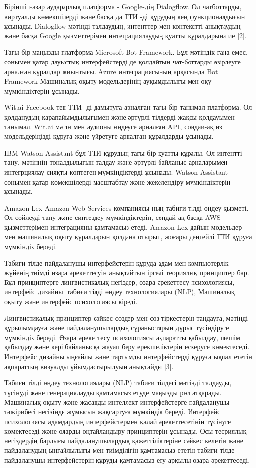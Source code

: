 \begin{multicols}{2}
Бірінші назар аударарлық платформа - Google-дің Dialogflow. Ол
чатботтарды, виртуалды көмекшілерді және басқа да ТТИ -ді құрудың кең
функционалдығын ұсынады. Dialogflow мәтінді талдаудың, интенттер мен
контекстті анықтаудың және басқа Google қызметтерімен интеграциялаудың
қуатты құралдарына ие {[}2{]}.

Тағы бір маңызды платформа-Microsoft Bot Framework. Бұл мәтіндік ғана
емес, сонымен қатар дауыстық интерфейстерді де қолдайтын чат-боттарды
әзірлеуге арналған құралдар жиынтығы. Azure интеграциясының арқасында
Bot Framework Машиналық оқыту модельдерінің ауқымдылығы мен оқу
мүмкіндіктерін ұсынады.

Wit.ai Facebook-тен-ТТИ -ді дамытуға арналған тағы бір танымал
платформа. Ол қолданудың қарапайымдылығымен және әртүрлі тілдерді жақсы
қолдауымен танымал. Wit.ai мәтін мен аудионы өңдеуге арналған API,
сондай-ақ өз модельдеріңізді құруға және үйретуге арналған құралдарды
ұсынады.

IBM Watson Assistant-бұл ТТИ құрудың тағы бір қуатты құралы. Ол интентті
тану, мәтіннің тоналдылығын талдау және әртүрлі байланыс арналарымен
интегрциялау сияқты көптеген мүмкіндіктерді ұсынады. Watson Assistant
сонымен қатар көмекшілерді масштабтау және жекелендіру мүмкіндіктерін
ұсынады.

Amazon Lex-Amazon Web Services компаниясы-ның табиғи тілді өңдеу қызметі.
Ол сөйлеуді тану және синтездеу мүмкіндіктерін, сондай-ақ басқа AWS
қызметтерімен интеграцияны қамтамасыз етеді. Amazon Lex дайын модельдер
мен машиналық оқыту құралдарын қолдана отырып, жоғары деңгейлі ТТИ
құруға мүмкіндік береді.

Табиғи тілде пайдаланушы интерфейстерін құруда адам мен компьютерлік
жүйенің тиімді өзара әрекеттесуін анықтайтын іргелі теориялық принциптер
бар. Бұл принциптерге лингвистикалық негіздер, өзара әрекеттесу
психологиясы, интерфейс дизайны, табиғи тілді өңдеу технологиялары
(NLP), Машиналық оқыту және интерфейс психологиясы кіреді.

Лингвистикалық принциптер сәйкес сөздер мен сөз тіркестерін таңдауға,
мәтінді құрылымдауға және пайдаланушылардың сұраныстарын дұрыс
түсіндіруге мүмкіндік береді. Өзара әрекеттесу психологиясы ақпаратты
қабылдау, шешім қабылдау және кері байланысқа жауап беру ерекшеліктерін
ескеруге көмектеседі. Интерфейс дизайны ыңғайлы және тартымды
интерфейстерді құруға ықпал ететін ақпараттың визуалды ұйымдастырылуын
анықтайды {[}3{]}.

Табиғи тілді өңдеу технологиялары (NLP) табиғи тілдегі мәтінді талдауды,
түсінуді және генерациялауды қамтамасыз етуде маңызды рөл атқарады.
Машиналық оқыту және жасанды интеллект интерфейстерге пайдаланушы
тәжірибесі негізінде жұмысын жақсартуға мүмкіндік береді. Интерфейс
психологиясы адамдардың интерфейстермен қалай әрекеттесетінін түсінуге
көмектеседі және оларды оңтайландыру принциптерін ұсынады. Осы теориялық
негіздердің барлығы пайдаланушылардың қажеттіліктеріне сәйкес келетін
және пайдаланудың ыңғайлылығы мен тиімділігін қамтамасыз ететін табиғи
тілде пайдаланушы интерфейстерін құруды қамтамасыз ету арқылы өзара
әрекеттеседі.


\end{multicols}
